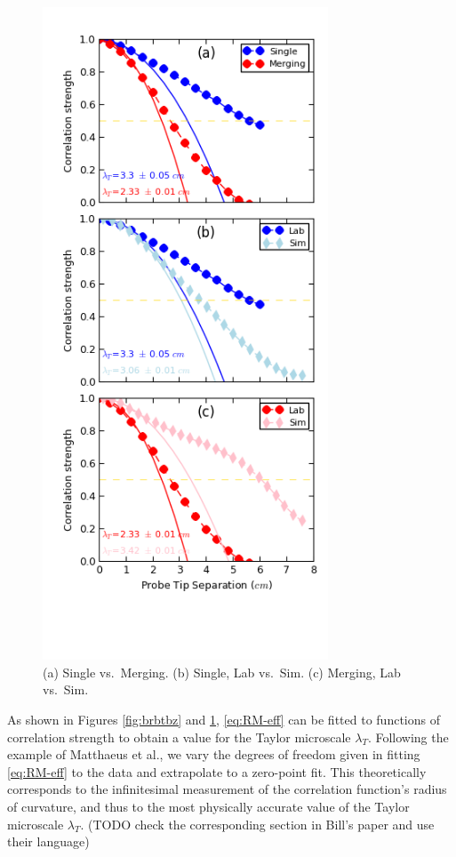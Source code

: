 \documentclass[aip,prl,amsmath,amssymb,reprint,superscriptaddress]{revtex4-1} %
\begin{document}
\begin{figure}[!htbp]
\centering
\includegraphics[width=8.5cm]{Images/comparisons.png}
\caption{\label{fig:comparisons} (a) Single vs.\ Merging. (b) Single, Lab vs.\ Sim. (c) Merging, Lab vs.\ Sim.}
\end{figure}

As shown in Figures \ref{fig:brbtbz} and \ref{fig:comparisons}, \eqref{eq:RM-eff} can be fitted to functions of correlation strength to obtain a value for the Taylor microscale $\lambda_T$. 
Following the example of Matthaeus et al.\cite{Matthaeus05}, we vary the degrees of freedom given in fitting \eqref{eq:RM-eff} to the data and extrapolate to a zero-point fit. This theoretically corresponds to the infinitesimal measurement of the correlation function's radius of curvature, and thus to the most physically accurate value of the Taylor microscale $\lambda_T$. 
(\textsf{TODO check the corresponding section in Bill's paper and use their language}) 
\end{document}
